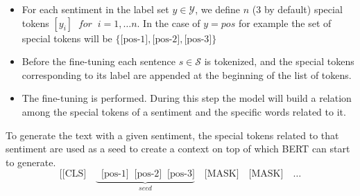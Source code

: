 \documentclass[10pt,twocolumn,letterpaper]{article}
\begin{document}
\begin{itemize}
\item For each sentiment in the label set $y\in\mathcal Y$, we define $n$ (3 by default) special tokens $[y_i]\;\; for\;\;i=1,\ldots n$.
In the case of $y=pos$ for example the set of special tokens will be $\{\text{[pos-1]}, \text{[pos-2]}, \text{[pos-3]}\}$
\item Before the fine-tuning each sentence $s\in\mathcal S$ is tokenized, and the special tokens corresponding to its label are appended at the beginning of the list of tokens.
\item The fine-tuning is performed. During this step the model will build a relation among the special tokens of a sentiment and the specific words
related to it.
\end{itemize}
To generate the text with a given sentiment, the special tokens related to that sentiment are used as a seed to create
a context on top of which BERT can start to generate.
$$\big[     \text{[CLS]}\quad\underbrace{ \;\; \text{[pos-1]} \;\; \text{[pos-2]} \;\; \text{[pos-3]}}_{seed}
      \quad      \text{[MASK]} \quad\text{[MASK]}\quad\ldots$$
\end{document}
